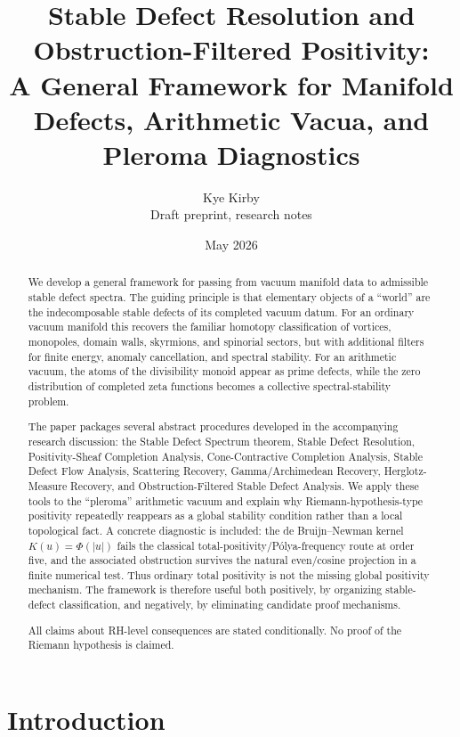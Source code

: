 \documentclass[11pt]{article}
\title{Stable Defect Resolution and Obstruction-Filtered Positivity:\\
A General Framework for Manifold Defects, Arithmetic Vacua, and Pleroma Diagnostics}
\author{Kye Kirby\\
\small Draft preprint, research notes}
\date{May 2026}
\begin{document}
\maketitle

\begin{abstract}
We develop a general framework for passing from vacuum manifold data to admissible stable defect spectra. The guiding principle is that elementary objects of a ``world'' are the indecomposable stable defects of its completed vacuum datum. For an ordinary vacuum manifold this recovers the familiar homotopy classification of vortices, monopoles, domain walls, skyrmions, and spinorial sectors, but with additional filters for finite energy, anomaly cancellation, and spectral stability. For an arithmetic vacuum, the atoms of the divisibility monoid appear as prime defects, while the zero distribution of completed zeta functions becomes a collective spectral-stability problem.

The paper packages several abstract procedures developed in the accompanying research discussion: the Stable Defect Spectrum theorem, Stable Defect Resolution, Positivity-Sheaf Completion Analysis, Cone-Contractive Completion Analysis, Stable Defect Flow Analysis, Scattering Recovery, Gamma/Archimedean Recovery, Herglotz-Measure Recovery, and Obstruction-Filtered Stable Defect Analysis. We apply these tools to the ``pleroma'' arithmetic vacuum and explain why Riemann-hypothesis-type positivity repeatedly reappears as a global stability condition rather than a local topological fact. A concrete diagnostic is included: the de Bruijn--Newman kernel $K(u)=\Phi(|u|)$ fails the classical total-positivity/P\'olya-frequency route at order five, and the associated obstruction survives the natural even/cosine projection in a finite numerical test. Thus ordinary total positivity is not the missing global positivity mechanism. The framework is therefore useful both positively, by organizing stable-defect classification, and negatively, by eliminating candidate proof mechanisms.

All claims about RH-level consequences are stated conditionally. No proof of the Riemann hypothesis is claimed.
\end{abstract}

\tableofcontents

\section{Introduction}
\end{document}
